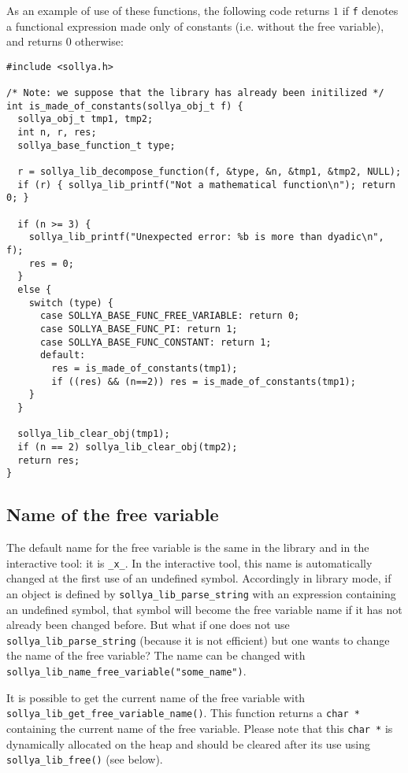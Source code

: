 \documentclass[a4paper]{article}
\begin{document}
As an example of use of these functions, the following code returns $1$ if \texttt{f} denotes a functional expression made only of constants (i.e. without the free variable), and returns $0$ otherwise:

\begin{center}\begin{minipage}{15cm}\begin{Verbatim}[frame=single]
#include <sollya.h>

/* Note: we suppose that the library has already been initilized */
int is_made_of_constants(sollya_obj_t f) {
  sollya_obj_t tmp1, tmp2;
  int n, r, res;
  sollya_base_function_t type;

  r = sollya_lib_decompose_function(f, &type, &n, &tmp1, &tmp2, NULL);
  if (r) { sollya_lib_printf("Not a mathematical function\n"); return 0; }

  if (n >= 3) {
    sollya_lib_printf("Unexpected error: %b is more than dyadic\n", f);
    res = 0;
  }
  else {
    switch (type) {
      case SOLLYA_BASE_FUNC_FREE_VARIABLE: return 0;
      case SOLLYA_BASE_FUNC_PI: return 1;
      case SOLLYA_BASE_FUNC_CONSTANT: return 1;
      default:
        res = is_made_of_constants(tmp1);
        if ((res) && (n==2)) res = is_made_of_constants(tmp1);
    }
  }

  sollya_lib_clear_obj(tmp1);
  if (n == 2) sollya_lib_clear_obj(tmp2);
  return res;
}
\end{Verbatim}
\end{minipage}\end{center}

\subsection{Name of the free variable}
The default name for the free variable is the same in the library and in the interactive tool: it is \texttt{\_x\_}. In the interactive tool, this name is automatically changed at the first use of an undefined symbol. Accordingly in library mode, if an object is defined by \texttt{sollya\_lib\_parse\_string} with an expression containing an undefined symbol, that symbol will become the free variable name if it has not already been changed before. But what if one does not use \texttt{sollya\_lib\_parse\_string} (because it is not efficient) but one wants to change the name of the free variable? The name can be changed with \texttt{sollya\_lib\_name\_free\_variable("some\_name")}.

It is possible to get the current name of the free variable with \texttt{sollya\_lib\_get\_free\_variable\_name()}. This function returns a \texttt{char *} containing the current name of the free variable. Please note that this \texttt{char *} is dynamically allocated on the heap and should be cleared after its use using \texttt{sollya\_lib\_free()} (see below).
\end{document}
